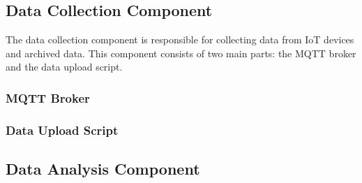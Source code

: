 \subsection{Data Collection Component}

The data collection component is responsible for collecting data from IoT devices and archived data. This component consists of two main parts: the MQTT broker and the data upload script.

\subsubsection{MQTT Broker}


\subsubsection{Data Upload Script}


\subsection{Data Analysis Component}

